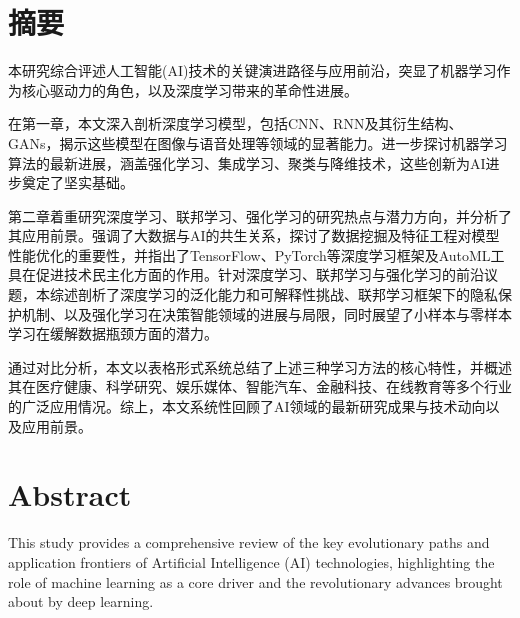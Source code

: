 \maketitle%
\MAKETITLE%
\makedeclaration%
\intobmk\chapter*{摘\quad 要}%
\setcounter{page}{1}%

本研究综合评述人工智能(AI)技术的关键演进路径与应用前沿，突显了机器学习作为核心驱动力的角色，以及深度学习带来的革命性进展。

在第一章，本文深入剖析深度学习模型，包括CNN、RNN及其衍生结构、GANs，揭示这些模型在图像与语音处理等领域的显著能力。进一步探讨机器学习算法的最新进展，涵盖强化学习、集成学习、聚类与降维技术，这些创新为AI进步奠定了坚实基础。

第二章着重研究深度学习、联邦学习、强化学习的研究热点与潜力方向，并分析了其应用前景。强调了大数据与AI的共生关系，探讨了数据挖掘及特征工程对模型性能优化的重要性，并指出了TensorFlow、PyTorch等深度学习框架及AutoML工具在促进技术民主化方面的作用。针对深度学习、联邦学习与强化学习的前沿议题，本综述剖析了深度学习的泛化能力和可解释性挑战、联邦学习框架下的隐私保护机制、以及强化学习在决策智能领域的进展与局限，同时展望了小样本与零样本学习在缓解数据瓶颈方面的潜力。

通过对比分析，本文以表格形式系统总结了上述三种学习方法的核心特性，并概述其在医疗健康、科学研究、娱乐媒体、智能汽车、金融科技、在线教育等多个行业的广泛应用情况。综上，本文系统性回顾了AI领域的最新研究成果与技术动向以及应用前景。

\intobmk\chapter*{Abstract}%

This study provides a comprehensive review of the key evolutionary paths and application frontiers of Artificial Intelligence (AI) technologies, highlighting the role of machine learning as a core driver and the revolutionary advances brought about by deep learning.

